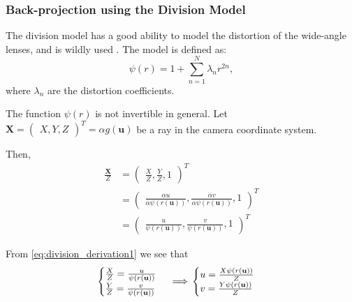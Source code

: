 \subsubsection{Back-projection using the Division Model}\label{subsub:back_projection_using_the_division_model}

The division model has a good ability to model the distortion of the wide-angle
lenses, and is wildly used . The model is defined as:
\begin{equation}
	\psi(r) = 1 + \sum_{n = 1}^{N} \lambda_n r^{2n},
\end{equation}
where \(\lambda_n\) are the distortion coefficients.

The function \(\psi(r)\) is not invertible in general.
Let \(\mathbf{X} = \begin{pmatrix}
	X, Y, Z
\end{pmatrix}^{T} = \alpha g(\mathbf{u})\) be a ray in the camera coordinate system.

Then,
\begin{align}
	\frac{\mathbf{X}}{Z} & =
	\begin{pmatrix}
		\frac{X}{Z}, \frac{Y}{Z}, 1
	\end{pmatrix}^{T}                               \\        & =
	\begin{pmatrix}
		\frac{\alpha u}{\alpha \psi(r(\mathbf{u}))},
		\frac{\alpha v}{\alpha \psi(r(\mathbf{u}))},
		1
	\end{pmatrix}^{T}  \\
	                     & = \label{eq:division_derivation1}
	\begin{pmatrix}
		\frac{u}{\psi(r(\mathbf{u}))},
		\frac{v}{\psi(r(\mathbf{u}))},
		1
	\end{pmatrix}^{T}
\end{align}

From \ref{eq:division_derivation1} we see that
\begin{equation} \label{eq:division_derivation2}
	\begin{cases}
		\frac{X}{Z} = \frac{u}{\psi(r(\mathbf{u}))} \\
		\frac{Y}{Z} = \frac{v}{\psi(r(\mathbf{u}))}
	\end{cases} \implies \\
	\begin{cases}
		u = \frac{X \psi(r(\mathbf{u}))}{Z} \\
		v = \frac{Y \psi(r(\mathbf{u}))}{Z}
	\end{cases}
\end{equation}

